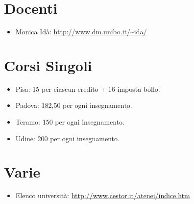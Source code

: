 \documentclass[a4paper,10pt]{article}
\begin{document}
\section{Docenti}
\begin{itemize}
 \item Monica Idà: \url{http://www.dm.unibo.it/~ida/}
\end{itemize}


\section{Corsi Singoli}
\begin{itemize}
 \item Pisa: 15 per ciascun credito + 16 imposta bollo.
 \item Padova: 182,50 per ogni insegnamento.
 \item Teramo: 150 per ogni insegnamento.
 \item Udine: 200 per ogni insegnamento. 
\end{itemize}

\section{Varie}
\begin{itemize}
 \item Elenco università: \url{http://www.cestor.it/atenei/indice.htm}
\end{itemize}
\end{document}
